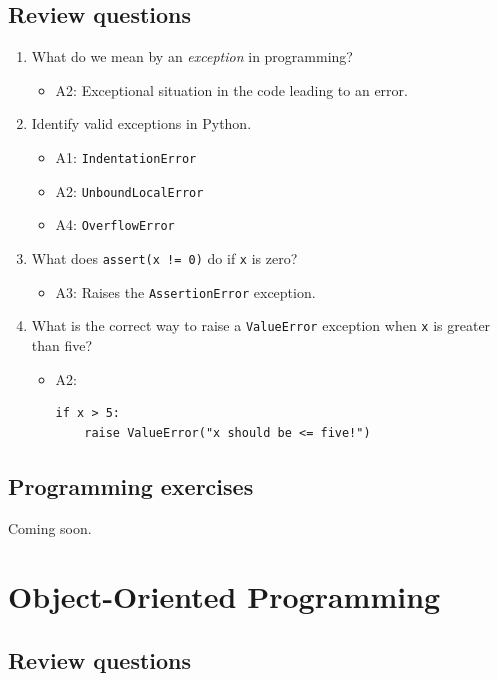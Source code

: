 \documentclass[article,A4,12pt]{llncs}
\begin{document}
\subsection{Review questions}

\begin{enumerate}
\item What do we mean by an {\em exception} in programming?
  \begin{itemize}
    \item A2: Exceptional situation in the code leading to an error. 
  \end{itemize}
\item Identify valid exceptions in Python.
  \begin{itemize}
    \item A1: {\tt IndentationError}
    \item A2: {\tt UnboundLocalError}
    \item A4: {\tt OverflowError}
  \end{itemize}
\item What does {\tt assert(x != 0)} do if {\tt x} is zero?
  \begin{itemize}
    \item A3: Raises the {\tt AssertionError} exception.
  \end{itemize}
\item What is the correct way to raise a {\tt ValueError} exception 
      when {\tt x} is greater than five?
  \begin{itemize}
    \item A2:
\begin{verbatim}
if x > 5:
    raise ValueError("x should be <= five!")
\end{verbatim}
  \end{itemize}
\end{enumerate}


\subsection{Programming exercises}

Coming soon.

\section{Object-Oriented Programming}

\subsection{Review questions}
\end{document}
